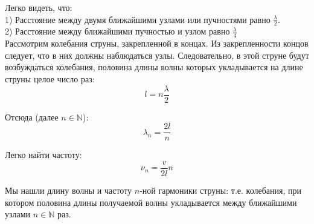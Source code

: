 \documentclass{article}
\begin{document}
	Легко видеть, что:\\

	1) Расстояние между двумя ближайшими узлами или пучностями равно $\frac{\lambda}{2}$.\\

	2) Расстояние между ближайшими пучностью и узлом равно $\frac{\lambda}{4}$\\

	Рассмотрим колебания струны, закрепленной в концах. Из закрепленности концов следует, что в них должны наблюдаться узлы. Следовательно, в этой струне будут возбуждаться колебания, половина длины волны которых укладывается на длине струны целое число раз:
	\begin{equation}
		l = n\frac{\lambda}{2}
	\end{equation}

	Отсюда (далее $n\in\mathbb{N}$):
	\begin{equation}
		\lambda_n = \frac{2l}{n}
	\end{equation}

	Легко найти частоту:
	\begin{equation}
		\nu_n = \frac{v}{2l}n
	\end{equation}

	Мы нашли длину волны и частоту $n$-ной гармоники струны: т.е. колебания, при котором половина длины получаемой волны укладывается между ближайшими узлами $n\in\mathbb{N}$ раз.
\end{document}

